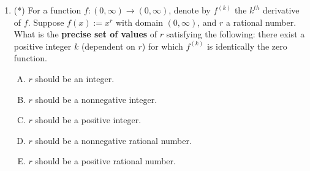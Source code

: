 \documentclass[10pt]{amsart}
\begin{document}
\begin{enumerate}
  {\em Answer}: Option (C)

  {\em Explanation}: If the function is differentiable, then the
  tangent line has finite slope, and hence cannot be vertical. Thus,
  it is not parallel to the $y$-axis, and hence must intersect the
  $y$-axis.

  {\em The other choices}:

  Option (A) is not true, as discussed in class. For instance, for the
  $\sin$ function, the tangent line through any of the peak points is
  $y = 1$, and passes through all the peak points, hence it intersects
  the graph infinitely often. We can graphically construct a lot of
  examples where the tangent line at one point in the graph intersects
  the graph elsewhere. There are certain classes of functions for
  which the statement of option (A) {\em is} true, and we'll talk more
  about this when we discuss concave up and concave down.

  Option (B) is not true. The tangent line to $(\pi/2,1)$ for the
  $\sin$ function is $y = 1$ -- a horizontal line. Thus, it does not
  intersect the $x$-axis. In general, the tangent line does not
  intersect the $x$-axis iff it is horizontal, which happens iff the
  derivative at the point is zero.

  {\em Performance review}: $11$ out of $12$ people got this
  correct. $1$ chose (E).

  {\em Historical note (last year)}: $6$ out of $12$ people got this
  correct. $5$ people chose option (E) (in other words, they were not
  convinced by any of the options (A)-(D)) and $1$ person chose option
  (D).

  {\em Note on better performance this year}: The question was starred
  and hence people were able to convince each other of the correct
  ideas through discussion.
\item (*) For a function $f: (0,\infty) \to (0,\infty)$, denote by
  $f^{(k)}$ the $k^{th}$ derivative of $f$. Suppose $f(x) := x^r$ with
  domain $(0,\infty)$, and $r$ a rational number. What is the {\bf
  precise set of values} of $r$ satisfying the following: there exist
  a positive integer $k$ (dependent on $r$) for which $f^{(k)}$ is
  identically the zero function.

  \begin{enumerate}[(A)]
  \item $r$ should be an integer.
  \item $r$ should be a nonnegative integer.
  \item $r$ should be a positive integer.
  \item $r$ should be a nonnegative rational number.
  \item $r$ should be a positive rational number.
  \end{enumerate}


\end{enumerate}
\end{document}
